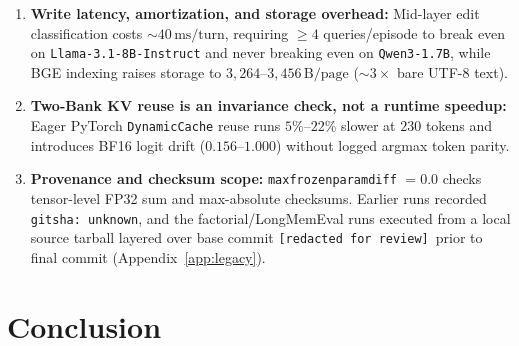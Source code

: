 \documentclass[10pt]{article}
\renewcommand{\_}{\origunderscore\allowbreak}
\begin{document}
\begin{enumerate}
    \item \textbf{Write latency, amortization, and storage overhead:} Mid-layer edit classification costs $\sim 40\,\text{ms/turn}$, requiring $\ge 4$ queries/episode to break even on \texttt{Llama-3.1-8B-Instruct} and never breaking even on \texttt{Qwen3-1.7B}, while BGE indexing raises storage to $3{,}264$--$3{,}456\,\text{B/page}$ ($\sim 3\times$ bare UTF-8 text).
    \item \textbf{Two-Bank KV reuse is an invariance check, not a runtime speedup:} Eager PyTorch \texttt{DynamicCache} reuse runs $5\%$--$22\%$ slower at $230$ tokens and introduces BF16 logit drift ($0.156$--$1.000$) without logged argmax token parity.
    \item \textbf{Provenance and checksum scope:} \texttt{max\_frozen\_param\_diff} $=0.0$ checks tensor-level FP32 sum and max-absolute checksums. Earlier runs recorded \texttt{git\_sha: unknown}, and the factorial/LongMemEval runs executed from a local source tarball layered over base commit \texttt{[redacted for review]}\ prior to final commit (Appendix~\ref{app:legacy}).
\end{enumerate}

\section{Conclusion}
\label{sec:conclusion}
\end{document}
